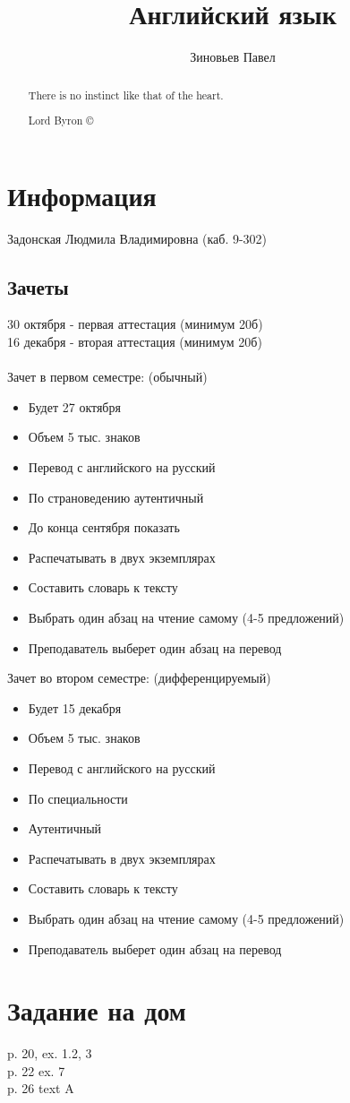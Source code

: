 \documentclass[a4paper, 11pt, oneside]{article}
\title{Английский язык}
\author{Зиновьев Павел}
\begin{document}
\maketitle
\begin{abstract}
	There is no instinct like that of the heart.
	\begin{flushright}
		 Lord Byron \copyright
	\end{flushright}
\end{abstract}
\newpage
\tableofcontents
\newpage

\section{Информация}
Задонская Людмила Владимировна (каб. 9-302)
\subsection{Зачеты}
30 октября - первая аттестация (минимум 20б)\\
16 декабря - вторая аттестация (минимум 20б)\\\\
Зачет в первом семестре: (обычный)
\begin{itemize}
	\item Будет 27 октября
	\item Объем 5 тыс. знаков
	\item Перевод с английского на русский
	\item По страноведению аутентичный
	\item До конца сентября показать
	\item Распечатывать в двух экземплярах
	\item Составить словарь к тексту
	\item Выбрать один абзац на чтение самому (4-5 предложений)
	\item Преподаватель выберет один абзац на перевод
\end{itemize}
Зачет во втором семестре: (дифференцируемый)
\begin{itemize}
	\item Будет 15 декабря
	\item Объем 5 тыс. знаков
	\item Перевод с английского на русский
	\item По специальности
	\item Аутентичный
	\item Распечатывать в двух экземплярах
	\item Составить словарь к тексту
	\item Выбрать один абзац на чтение самому (4-5 предложений)
	\item Преподаватель выберет один абзац на перевод
\end{itemize}

\section{Задание на дом}
p. 20, ex. 1.2, 3\\
p. 22 ex. 7\\
p. 26 text A
\end{document}
